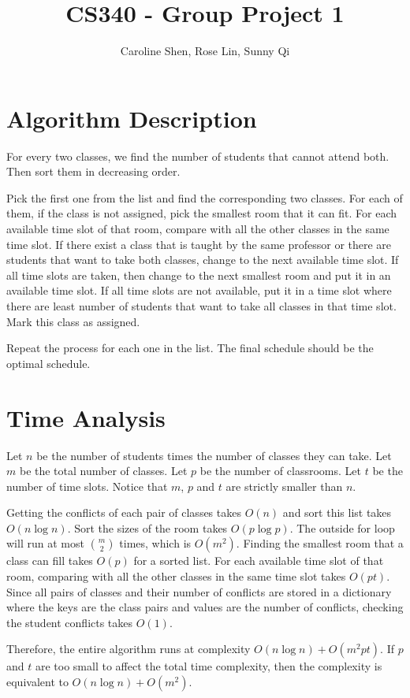 \documentclass[11pt, oneside]{article}   	%
\title{CS340 - Group Project 1}
\author{Caroline Shen, Rose Lin, Sunny Qi}
\date{}							%
\begin{document}
\maketitle


\section{Algorithm Description}
For every two classes, we find the number of students that cannot attend both. Then sort them in decreasing order. 

Pick the first one from the list and find the corresponding two classes. For each of them, if the class is not assigned, pick the smallest room that it can fit. For each available time slot of that room, compare with all the other classes in the same time slot. If there exist a class that is taught by the same professor or there are students that want to take both classes, change to the next available time slot. If all time slots are taken, then change to the next smallest room and put it in an available time slot. If all time slots are not available, put it in a time slot where there are least number of students that want to take all classes in that time slot. Mark this class as assigned. 

Repeat the process for each one in the list. The final schedule should be the optimal schedule.

\section{Time Analysis}
Let $n$ be the number of students times the number of classes they can take. Let $m$ be the total number of classes. Let $p$ be the number of classrooms. Let $t$ be the number of time slots. Notice that $m$, $p$ and $t$ are strictly smaller than $n$.

Getting the conflicts of each pair of classes takes $O(n)$ and sort this list takes $O(n\log n)$. Sort the sizes of the room takes $O(p \log p)$. The outside for loop will run at most $m \choose 2$ times, which is $O(m^2)$. Finding the smallest room that a class can fill takes $O(p)$ for a sorted list. For each available time slot of that room, comparing with all the other classes in the same time slot takes $O(pt)$. Since all pairs of classes and their number of conflicts are stored in a dictionary where the keys are the class pairs and values are the number of conflicts, checking the student conflicts takes $O(1)$.

Therefore, the entire algorithm runs at complexity $O(n \log n)+O(m^2pt)$. If $p$ and $t$ are too small to affect the total time complexity, then the complexity is equivalent to $O(n \log n)+O(m^2)$.
\end{document}
